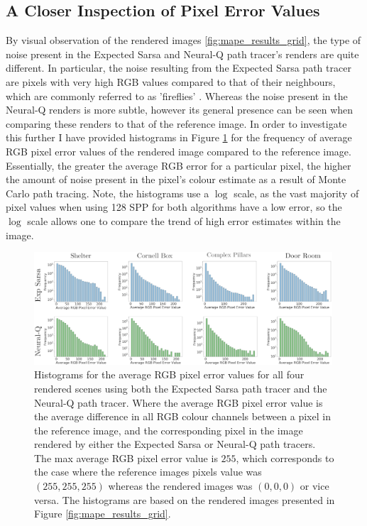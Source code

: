 \documentclass[../dissertation.tex]{subfiles}
\begin{document}
\subsection{A Closer Inspection of Pixel Error Values}
\label{sec:close_inspec_pixels}

By visual observation of the rendered images \ref{fig:mape_results_grid}, the type of noise present in the Expected Sarsa and Neural-Q path tracer's renders are quite different. In particular, the noise resulting from the Expected Sarsa path tracer are pixels with very high RGB values compared to that of their neighbours, which are commonly referred to as 'fireflies'  \cite{christensen2016path}. Whereas the noise present in the Neural-Q renders is more subtle, however its general presence can be seen when comparing these renders to that of the reference image. In order to investigate this further I have provided histograms in Figure \ref{fig:histogram_errors} for the frequency of average RGB pixel error values of the rendered image compared to the reference image. Essentially, the greater the average RGB error for a particular pixel, the higher the amount of noise present in the pixel's colour estimate as a result of Monte Carlo path tracing. Note, the histograms use a $\log$ scale, as the vast majority of pixel values when using 128 SPP for both algorithms have a low error, so the $\log$ scale allows one to compare the trend of high error estimates within the image. 

\begin{figure}[h]
\begin{center}
\includegraphics[width=0.99\textwidth]{images/noise_diff.png}    
\end{center}
\caption{Histograms for the average RGB pixel error values for all four rendered scenes using both the Expected Sarsa path tracer and the Neural-Q path tracer. Where the average RGB pixel error value is the average difference in all RGB colour channels between a pixel in the reference image, and the corresponding pixel in the image rendered by either the Expected Sarsa or Neural-Q path tracers. The max average RGB pixel error value is $255$, which corresponds to the case where the reference images pixels value was $(255,255,255)$ whereas the rendered images was $(0,0,0)$ or vice versa. The histograms are based on the rendered images presented in Figure \ref{fig:mape_results_grid}.}
\label{fig:histogram_errors}
\end{figure}
\end{document}
